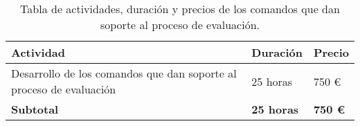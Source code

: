 \begin{table}[!ht]
  \begin{center}
  \begin{tabular}{|p{80mm}|p{25mm}|p{20mm}|} \hline 
  \textbf{Actividad} & \textbf{Duración} & \textbf{Precio} \\ \hline
  
  Desarrollo de los comandos que dan soporte al proceso de evaluación &
  25 horas &
  750 \euro{}
  \\
  \hline
  \hline \hline
  {\bfseries Subtotal} &
  {\bfseries 25 horas} &
  {\bfseries 750 \euro{}}
  \\
  \hline
  
  \end{tabular}
  \end{center}
  \caption{Tabla de actividades, duración y precios de los comandos que dan soporte al proceso de evaluación.}
  \label{table:resOthers3}
  \end{table}
  
  
